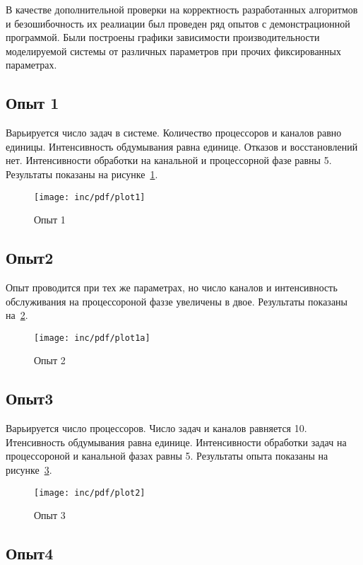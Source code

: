 В качестве дополнительной проверки на корректность разработанных алгоритмов и безошибочность их реалиации был проведен ряд опытов с демонстрационной программой. Были построены графики зависимости производительности моделируемой системы от различных параметров при прочих фиксированных параметрах.

\subsection*{Опыт 1}

Варьируется число задач в системе. Количество процессоров и каналов равно единицы. Интенсивность обдумывания равна единице. Отказов и восстановлений нет. Интенсивности обработки на канальной и процессорной фазе равны 5. Результаты показаны на рисунке~\ref{fig:plot1}.

\begin{figure}[ht]
  \centering
  \texttt{[image: inc/pdf/plot1]}
  \caption{Опыт 1}
  \label{fig:plot1}
\end{figure}

\subsection*{Опыт2}

Опыт проводится при тех же параметрах, но число каналов и интенсивность обслуживания на процессороной фаззе увеличены в двое. Результаты показаны на~\ref{fig:plot1a}.

\begin{figure}[ht]
  \centering
  \texttt{[image: inc/pdf/plot1a]}
  \caption{Опыт 2}
  \label{fig:plot1a}
\end{figure}


\subsection*{Опыт3}

Варьируется число процессоров. Число задач и каналов равняется 10. Итенсивность обдумывания равна единице. Интенсивности обработки задач на процессороной и канальной фазах равны 5. Результаты опыта показаны на рисунке~\ref{fig:plot2}.

\begin{figure}[ht!]
  \centering
  \texttt{[image: inc/pdf/plot2]}
  \caption{Опыт 3}
  \label{fig:plot2}
\end{figure}

\subsection*{Опыт4}

